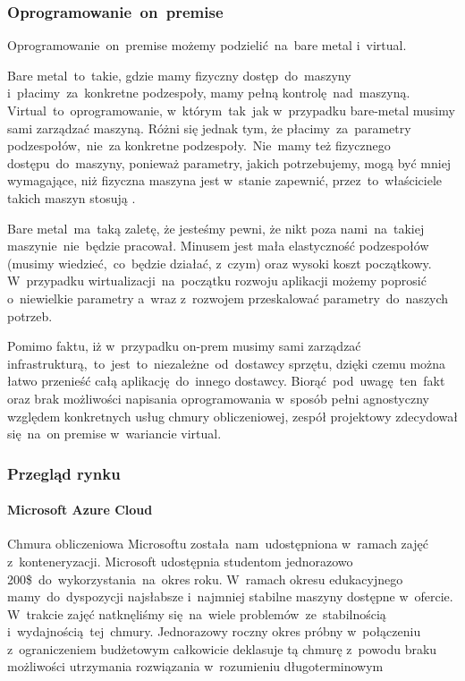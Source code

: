 \subsubsection{Oprogramowanie~on~premise}
Oprogramowanie~on~premise możemy podzielić~na~bare metal i~virtual.

Bare metal~to~takie, gdzie mamy fizyczny dostęp~do~maszyny i~płacimy~za~konkretne podzespoły, mamy pełną kontrolę~nad~maszyną.
Virtual~to~oprogramowanie, w~którym~tak~jak w~przypadku bare-metal musimy sami zarządzać maszyną.
Różni się jednak tym, że płacimy~za~parametry podzespołów,~nie~za konkretne podzespoły.~Nie~mamy też fizycznego dostępu~do~maszyny, ponieważ parametry, jakich potrzebujemy, mogą być mniej wymagające, niż fizyczna maszyna jest w~stanie zapewnić, przez~to~właściciele takich maszyn stosują .

Bare metal~ma~taką zaletę, że jesteśmy pewni, że nikt poza nami~na~takiej maszynie~nie~będzie pracował.
Minusem jest mała elastyczność podzespołów (musimy wiedzieć,~co~będzie działać, z~czym) oraz wysoki koszt początkowy.
W~przypadku wirtualizacji~na~początku rozwoju aplikacji możemy poprosić o~niewielkie parametry a~wraz z~rozwojem przeskalować parametry~do~naszych potrzeb.

Pomimo faktu, iż w~przypadku \gls{on-prem} musimy sami zarządzać infrastrukturą,~to~jest~to~niezależne~od~dostawcy sprzętu, dzięki czemu można łatwo przenieść całą aplikację~do~innego dostawcy.
Biorąć~pod~uwagę~ten~fakt oraz brak możliwości napisania oprogramowania w~sposób pełni agnostyczny względem konkretnych usług chmury obliczeniowej, zespół projektowy zdecydował się~na~on premise w~wariancie virtual.

\subsubsection{Przegląd rynku}
\paragraph{Microsoft Azure Cloud}
Chmura obliczeniowa Microsoftu została~nam~udostępniona w~ramach zajęć z~konteneryzacji.
Microsoft udostępnia studentom jednorazowo 200\$~do~wykorzystania~na~okres roku.
W~ramach okresu edukacyjnego mamy~do~dyspozycji najsłabsze i~najmniej stabilne maszyny dostępne w~ofercie.
W~trakcie zajęć natknęliśmy się~na~wiele problemów~ze~stabilnością i~wydajnością~tej~chmury.
Jednorazowy roczny okres próbny w~połączeniu z~ograniczeniem budżetowym całkowicie deklasuje tą chmurę z~powodu braku możliwości utrzymania rozwiązania w~rozumieniu długoterminowym

